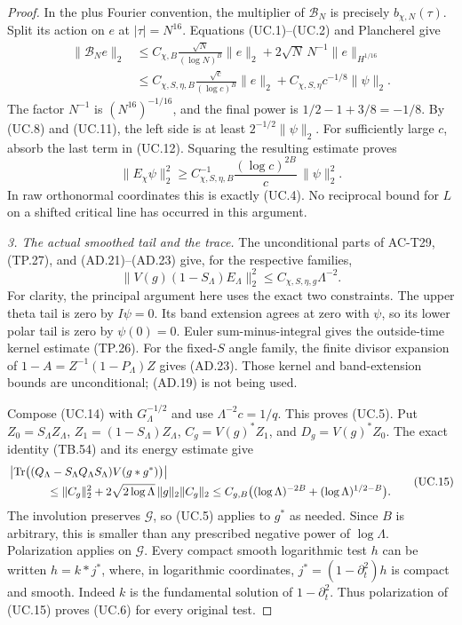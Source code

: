\begin{proof}
In the plus Fourier convention, the multiplier of
\(\mathcal B_N\) is precisely \(b_{\chi,N}(\tau)\).
Split its action on \(e\) at \(|\tau|=N^{16}\).
Equations (UC.1)--(UC.2) and Plancherel give
\[
 \begin{split}
 \|\mathcal B_Ne\|_2
 &\leq C_{\chi,B}\frac{\sqrt N}{(\log N)^B}\|e\|_2
     +2\sqrt N\,N^{-1}\|e\|_{H^{1/16}}\\
 &\leq C_{\chi,S,\eta,B}
              \frac{\sqrt c}{(\log c)^B}\|e\|_2
        +C_{\chi,S,\eta}c^{-1/8}\|\psi\|_2 .
 \end{split}
 \tag{UC.12}
\]
The factor \(N^{-1}\) is
\((N^{16})^{-1/16}\), and the final power is
\(1/2-1+3/8=-1/8\).
By (UC.8) and (UC.11), the left side is at least
\(2^{-1/2}\|\psi\|_2\).
For sufficiently large \(c\), absorb the last term in
(UC.12).  Squaring the resulting estimate proves
\[
       \|E_\chi\psi\|_2^2
          \geq C_{\chi,S,\eta,B}^{-1}
                      \frac{(\log c)^{2B}}c\,\|\psi\|_2^2 .
 \tag{UC.13}
\]
In raw orthonormal coordinates this is exactly (UC.4).
No reciprocal bound for \(L\) on a shifted critical line
has occurred in this argument.

\emph{3. The actual smoothed tail and the trace.}
The unconditional parts of AC-T29, (TP.27), and
(AD.21)--(AD.23) give, for the respective families,
\[
            \|V(g)(1-S_\Lambda)E_\Lambda\|_2^2
                     \leq C_{\chi,S,\eta,g}\Lambda^{-2}.
 \tag{UC.14}
\]
For clarity, the principal argument here uses the exact
two constraints.  The upper theta tail is zero by
\(I\psi=0\).  Its band extension agrees at zero with
\(\psi\), so its lower polar tail is zero by
\(\psi(0)=0\).  Euler sum-minus-integral gives the
outside-time kernel estimate (TP.26).
For the fixed-\(S\) angle family, the finite divisor
expansion of \(1-A=Z^{-1}(1-P_\Lambda)Z\) gives (AD.23).
Those kernel and band-extension bounds are unconditional;
(AD.19) is not being used.

Compose (UC.14) with \(G_\Lambda^{-1/2}\) and use
\(\Lambda^{-2}c=1/q\).
This proves (UC.5).
Put \(Z_0=S_\Lambda Z_\Lambda\), \(Z_1=(1-S_\Lambda)Z_\Lambda\),
\(C_g=V(g)^*Z_1\), and \(D_g=V(g)^*Z_0\).
The exact identity (TB.54) and its energy estimate give
\[
 \begin{split}
 &\left|\operatorname{Tr}
  \bigl((Q_\Lambda-S_\Lambda Q_\Lambda S_\Lambda)
                                  V(g*g^*)\bigr)\right|\\
 &\hspace{12mm}\leq
 \|C_g\|_2^2+
       2\sqrt{2\log\Lambda}\,\|g\|_2\|C_g\|_2
       \leq C_{g,B}
           \bigl((\log\Lambda)^{-2B}
                    +(\log\Lambda)^{1/2-B}\bigr).
 \end{split}
 \tag{UC.15}
\]
The involution preserves \(\mathscr G\), so (UC.5) applies
to \(g^*\) as needed.
Since \(B\) is arbitrary, this is smaller than any prescribed
negative power of \(\log\Lambda\).
Polarization applies on \(\mathscr G\).
Every compact smooth logarithmic test \(h\) can be written
\(h=k*j^*\), where, in logarithmic coordinates,
\(j^*=(1-\partial_t^2)h\) is compact and smooth.
Indeed \(k\) is the fundamental solution of
\(1-\partial_t^2\).
Thus polarization of (UC.15) proves (UC.6) for every
original test.


\end{proof}
